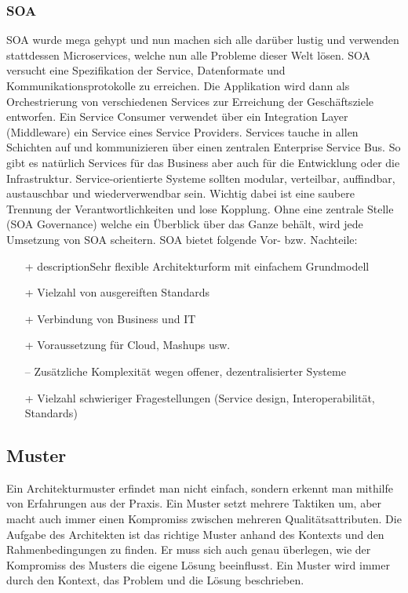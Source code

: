 \subsubsection{SOA}

SOA wurde mega gehypt und nun machen sich alle darüber lustig und verwenden stattdessen Microservices, welche nun alle Probleme dieser Welt lösen. SOA versucht eine Spezifikation der Service, Datenformate und Kommunikationsprotokolle zu erreichen. Die Applikation wird dann als Orchestrierung von verschiedenen Services zur Erreichung der Geschäftsziele entworfen. Ein Service Consumer verwendet über ein Integration Layer (Middleware) ein Service eines Service Providers. Services tauche in allen Schichten auf und kommunizieren über einen zentralen Enterprise Service Bus. So gibt es natürlich Services für das Business aber auch für die Entwicklung oder die Infrastruktur. Service-orientierte Systeme sollten modular, verteilbar, auffindbar, austauschbar und wiederverwendbar sein. Wichtig dabei ist eine saubere Trennung der Verantwortlichkeiten und lose Kopplung. Ohne eine zentrale Stelle (SOA Governance) welche ein Überblick über das Ganze behält, wird jede Umsetzung von SOA scheitern. SOA bietet folgende Vor- bzw. Nachteile:
\begin{itemize}
	\item[+] descriptionSehr flexible Architekturform mit einfachem Grundmodell
	\item[+] Vielzahl von ausgereiften Standards
	\item[+] Verbindung von Business und IT
	\item[+] Voraussetzung für Cloud, Mashups usw.
	\item[--] Zusätzliche Komplexität wegen offener, dezentralisierter Systeme	
	\item[+] Vielzahl schwieriger Fragestellungen (Service design, Interoperabilität, Standards)
\end{itemize}

\subsection{Muster}

Ein Architekturmuster erfindet man nicht einfach, sondern erkennt man mithilfe von Erfahrungen aus der Praxis. Ein Muster setzt mehrere Taktiken um, aber macht auch immer einen Kompromiss zwischen mehreren Qualitätsattributen. Die Aufgabe des Architekten ist das richtige Muster anhand des Kontexts und den Rahmenbedingungen zu finden. Er muss sich auch genau überlegen, wie der Kompromiss des Musters die eigene Lösung beeinflusst. Ein Muster wird immer durch den Kontext, das Problem und die Lösung beschrieben.

